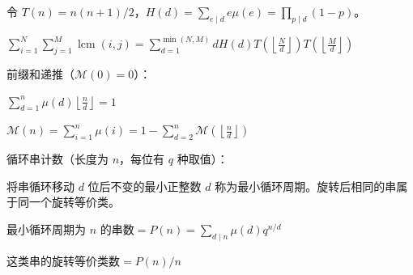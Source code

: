 令 $T(n)=n(n+1)/2$，$H(d)=\sum_{e\mid d}e\mu(e)=\prod_{p\mid d}(1-p)$。\nopagebreak[4]

$\displaystyle\sum_{i=1}^{N}\sum_{j=1}^{M}\operatorname{lcm}(i,j)=\sum_{d=1}^{\min(N,M)}dH(d)T\left(\left\lfloor\frac Nd\right\rfloor\right)T\left(\left\lfloor\frac Md\right\rfloor\right)$

前缀和递推（$\mathcal M(0)=0$）：\nopagebreak[4]

$\displaystyle\sum_{d=1}^{n}\mu(d)\left\lfloor\frac nd\right\rfloor=1$

$\mathcal M(n)=\displaystyle\sum_{i=1}^{n}\mu(i)=1-\sum_{d=2}^{n}\mathcal M\left(\left\lfloor\frac nd\right\rfloor\right)$

循环串计数（长度为 $n$，每位有 $q$ 种取值）：\nopagebreak[4]

将串循环移动 $d$ 位后不变的最小正整数 $d$ 称为最小循环周期。旋转后相同的串属于同一个旋转等价类。

$\text{最小循环周期为 $n$ 的串数}=P(n)=\displaystyle\sum_{d\mid n}\mu(d)q^{n/d}$

$\text{这类串的旋转等价类数}=P(n)/n$
